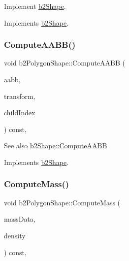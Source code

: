 Implement \mbox{\hyperlink{classb2_shape}{b2\+Shape}}. 



Implements \mbox{\hyperlink{classb2_shape_a4716243454bb9cf7c7ee1d9cb23ae634}{b2\+Shape}}.

\mbox{\label{classb2_polygon_shape_ae9bcc185caf4a030003cefc4576e4717}} 
\subsubsection{\texorpdfstring{ComputeAABB()}{ComputeAABB()}}
{\footnotesize\ttfamily void b2\+Polygon\+Shape\+::\+Compute\+A\+A\+BB (\begin{DoxyParamCaption}\item[{\mbox{\hyperlink{structb2_a_a_b_b}{b2\+A\+A\+BB}} $\ast$}]{aabb,  }\item[{const \mbox{\hyperlink{structb2_transform}{b2\+Transform}} \&}]{transform,  }\item[{\mbox{\hyperlink{b2_settings_8h_a43d43196463bde49cb067f5c20ab8481}{int32}}}]{child\+Index }\end{DoxyParamCaption}) const\hspace{0.3cm}{\ttfamily [override]}, {\ttfamily [virtual]}}

\begin{DoxySeeAlso}{See also}
\mbox{\hyperlink{classb2_shape_a88e9807fab0c8ca9a98d8926e50a1411}{b2\+Shape\+::\+Compute\+A\+A\+BB}} 
\end{DoxySeeAlso}


Implements \mbox{\hyperlink{classb2_shape_a88e9807fab0c8ca9a98d8926e50a1411}{b2\+Shape}}.

\mbox{\label{classb2_polygon_shape_a908db2a51fc79fd49d6fe06be2cd8474}} 
\subsubsection{\texorpdfstring{ComputeMass()}{ComputeMass()}}
{\footnotesize\ttfamily void b2\+Polygon\+Shape\+::\+Compute\+Mass (\begin{DoxyParamCaption}\item[{\mbox{\hyperlink{structb2_mass_data}{b2\+Mass\+Data}} $\ast$}]{mass\+Data,  }\item[{\mbox{\hyperlink{b2_settings_8h_aacdc525d6f7bddb3ae95d5c311bd06a1}{float32}}}]{density }\end{DoxyParamCaption}) const\hspace{0.3cm}{\ttfamily [override]}, {\ttfamily [virtual]}}

